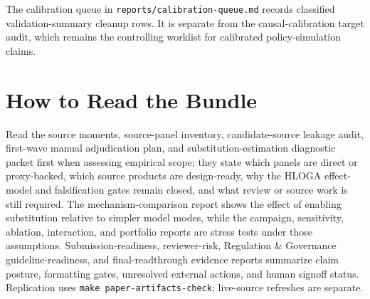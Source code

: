 The calibration queue in \texttt{reports/calibration-queue.md} records classified validation-summary cleanup rows. It is separate from the causal-calibration target audit, which remains the controlling worklist for calibrated policy-simulation claims.

\section{How to Read the Bundle}

Read the source moments, source-panel inventory, candidate-source leakage audit, first-wave manual adjudication plan, and substitution-estimation diagnostic packet first when assessing empirical scope; they state which panels are direct or proxy-backed, which source products are design-ready, why the HLOGA effect-model and falsification gates remain closed, and what review or source work is still required. The mechanism-comparison report shows the effect of enabling substitution relative to simpler model modes, while the campaign, sensitivity, ablation, interaction, and portfolio reports are stress tests under those assumptions. Submission-readiness, reviewer-risk, Regulation \& Governance guideline-readiness, and final-readthrough evidence reports summarize claim posture, formatting gates, unresolved external actions, and human signoff status. Replication uses \texttt{make paper-artifacts-check}; live-source refreshes are separate.
